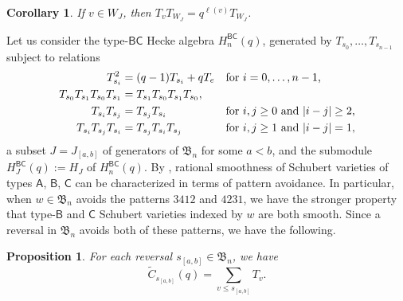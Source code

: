 \documentclass[12pt]{amsart}
\newtheorem{prop}[thm]{Proposition}
\newtheorem{cor}[thm]{Corollary}
\theoremstyle{definition}
\numberwithin{equation}{section}
\newcommand{\sn}{\mathfrak{S}_n}
\newcommand{\bn}{\mathfrak{B}_n}
\newcommand{\hbnq}{H_n^{\msfBC}(q)}
\newcommand{\hbjq}{H_J^{\msfBC}(q)}
\newcommand{\wtc}[2]{\widetilde{C}_{#1}(#2)}
\newcommand{\defeq}{:=}
\newcommand{\avoidsp}{avoids the patterns $3412$ and $4231${}}
\newcommand{\msfA}{\mathsf{A}}
\newcommand{\msfBB}{\mathsf{B}}
\newcommand{\msfC}{\mathsf{C}}
\newcommand{\msfBC}{\mathsf{BC}}
\begin{document}
\begin{cor}\label{c:doug}
    If $v \in W_J$, then
    $T_{v}T_{W_J} = q^{\ell(v)} T_{W_J}$.
   \end{cor}

Let us consider the type-$\msfBC$ Hecke algebra $\hbnq$, generated by
$T_{s_0}, \dotsc, T_{s_{n-1}}$ subject to relations
\begin{equation}\label{eq:hbnqpresentation}
  \begin{alignedat}2
    T_{s_i}^2 &= (q-1)T_{s_i} + qT_e &\quad &\text{for $i = 0, \dotsc, n-1$,}\\
    T_{s_0}T_{s_1}T_{s_0}T_{s_1} &= T_{s_1}T_{s_0}T_{s_1}T_{s_0}, &\quad & \\
    T_{s_i}T_{s_j} &= T_{s_j}T_{s_i} &\quad &\text{for $i,j \geq 0$ and $|i-j| \geq 2$,}\\
    T_{s_i}T_{s_j}T_{s_i} &= T_{s_j}T_{s_i}T_{s_j} &\quad &\text{for $i,j \geq 1$ and $|i-j| = 1$,}
  \end{alignedat}
\end{equation}
a subset $J = J_{[a,b]}$ of generators of $\bn$ for some $a < b$, and the submodule $\hbjq \defeq H_J$ of $\hbnq$. By \cite[\S 13.3.7]{BilleyLak},
rational smoothness of Schubert varieties of types $\msfA$, $\msfBB$, $\msfC$ 
can be characterized in terms of pattern avoidance. In particular, when $w \in \bn$ \avoidsp, we have the stronger property
that type-$\msfBB$ and $\msfC$ Schubert varieties indexed by $w$ are both smooth. Since a reversal in $\bn$ avoids both of these patterns, we have the following.

\begin{prop}\label{p:wtcreversal}
    For each reversal $s_{[a,b]} \in \bn$,
    we have
\begin{equation*}
\wtc{s_{[a,b]}}q = \sum_{v\leq s_{[a,b]}} T_v.     
    \end{equation*}
\end{prop}
\end{document}
